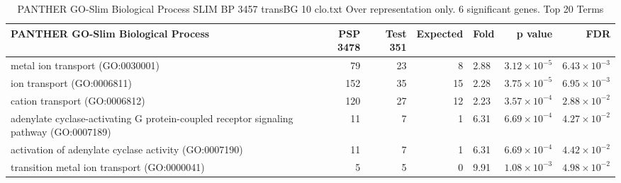 \begin{table}[ht]
\centering
\begin{adjustbox}{width=\textwidth}
\begin{tabular}{lrrrlrr}
  \hline
PANTHER GO-Slim Biological Process & PSP 3478 & Test 351 & Expected & Fold & p value & FDR \\ 
  \hline
metal ion transport (GO:0030001) & 79 & 23 & 8 & 2.88 & $3.12 \times 10^{-5}$ & $6.43 \times 10^{-3}$ \\ 
  ion transport (GO:0006811) & 152 & 35 & 15 & 2.28 & $3.75 \times 10^{-5}$ & $6.95 \times 10^{-3}$ \\ 
  cation transport (GO:0006812) & 120 & 27 & 12 & 2.23 & $3.57 \times 10^{-4}$ & $2.88 \times 10^{-2}$ \\ 
  adenylate cyclase-activating G protein-coupled receptor signaling pathway (GO:0007189) & 11 & 7 & 1 & 6.31 & $6.69 \times 10^{-4}$ & $4.27 \times 10^{-2}$ \\ 
  activation of adenylate cyclase activity (GO:0007190) & 11 & 7 & 1 & 6.31 & $6.69 \times 10^{-4}$ & $4.42 \times 10^{-2}$ \\ 
  transition metal ion transport (GO:0000041) & 5 & 5 & 0 & 9.91 & $1.08 \times 10^{-3}$ & $4.98 \times 10^{-2}$ \\ 
   \hline
\end{tabular}
\end{adjustbox}
\caption{PANTHER GO-Slim Biological Process SLIM BP 3457 transBG 10 clo.txt Over representation only. 6 significant genes. Top 20 Terms} 
\label{tab:PANTHER GO-Slim Biological Process SLIM BP 3457 transBG 10 clo.txt Over representation only. 6 significant genes. Top 20 Terms}
\end{table}



